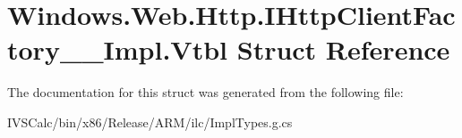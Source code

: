 \hypertarget{struct_windows_1_1_web_1_1_http_1_1_i_http_client_factory_____impl_1_1_vtbl}{}\section{Windows.\+Web.\+Http.\+I\+Http\+Client\+Factory\+\_\+\+\_\+\+Impl.\+Vtbl Struct Reference}
\label{struct_windows_1_1_web_1_1_http_1_1_i_http_client_factory_____impl_1_1_vtbl}


The documentation for this struct was generated from the following file\+:\begin{DoxyCompactItemize}
\item 
I\+V\+S\+Calc/bin/x86/\+Release/\+A\+R\+M/ilc/Impl\+Types.\+g.\+cs\end{DoxyCompactItemize}
